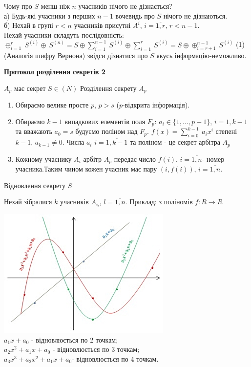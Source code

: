 Чому про $S$ менш ніж $n$ учасників нічого не дізнається?\\
а) Будь-які учасники з перших $n-1$ вочевидь про $S$ нічого не дізнаються.\\
б) Нехай в групі $r<n$ учасників присутні $A^{i}$, $i=\overline{1,r}$, $r<n-1$.\\
Нехай учасники складуть послідовність: $\oplus_{i=1}^r\ S^{(i)}\oplus\ S^{(n)}=S\oplus\sum\limits_{i=1}^{n-1}\ S^{(i)}\oplus\sum\limits_{i=1}^{r}\ S^{(i)}=S\oplus\oplus_{i=r+1}^{n-1}\ S^{(i)}$ (1) (Аналогія шифру Вернона) звідси дізнатися про $S$ якусь інформацію-неможливо.
\begin{center}
\textbf{Протокол розділення секретів 2}
\end{center}
$A_p$ має секрет $S\in(N)$
Розділення секрету $A_p$
\begin{enumerate}
\item Обираємо велике просте $p$, $p>s$ ($p$-відкрита інформація).
\item Обираємо $k-1$ випадкових елементів поля $F_p$: $a_i\in{\{1,...,p-1}\}$, $i=\overline{1,k-1}$ та вважають  $a_0=s$ будуємо поліном над $F_p$.
$f(x)=\sum\limits_{i=0}^{k-1}\ a_i x^{i}$ степені $k-1$, $a_{k-1}\ne 0$. Числа $a_i$ $i=\overline{1,k-1}$ та поліном - це секрет арбітра $A_p$
\item Кожному учаснику $A_i$ арбітр $A_p$  передає число $f(i)$, $i=\overline{1,n}$- номер учасника.Таким чином кожен учасник має пару $(i,f(i))$, $i=\overline{1,n}$.
\end{enumerate}

Відновлення секрету $S$

Нехай зібралися $k$ учасників $A_{i_l}$, $l=\overline{1,n}$.
Приклад: з поліномів $f:R\rightarrow R$

\includegraphics{PICTURE.jpg}
\\
$a_1 x+a_0$ - відновлюється по 2 точкам;
\\
$a_2x^2+a_1x+a_0$ - відновлюється по 3 точкам;
\\
$a_3x^3+a_2x^2+a_1x+a_0$- відновлюється по 4 точкам.

